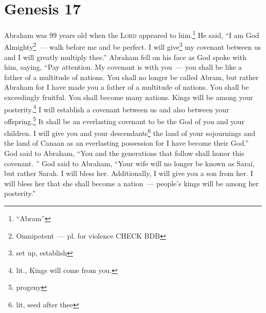 \section{Genesis 17}\label{Genesis 17}
\begin{enumerate}
     Abraham was 99 years old when the \textsc{Lord} appeared to him.\footnote{``Abram''} He said, ``I am God Almighty\footnote{Omnipotent~--- pl. for violence CHECK BDB}~--- walk before me and be perfect.%
     I will give\footnote{set up, establish} my covenant between us and I will greatly multiply thee.''%
     Abraham fell on his face as God spoke with him, saying,%
     ``Pay attention. My covenant is with you~--- you shall be like a father of a multitude of nations.%
     You shall no longer be called Abram, but rather Abraham for I have made you a father of a multitude of nations.%
     You shall be exceedingly fruitful. You shall become many nations. Kings will be among your posterity.\footnote{lit., Kings will come from you.}%
     I will establish a covenant between us and also between your offspring.\footnote{progeny} It shall be an everlasting covenant to be the God of you and your children.%
     I will give you and your descendants\footnote{lit, seed after thee} the land of your sojournings and the land of Canaan as an everlasting possession for I have become their God.''%
     God said to Abraham, ``You and the generations that follow shall honor this covenant.%
     ''%
     God said to Abraham, ``Your wife will no longer be known as Sarai, but rather Sarah.%
     I will bless her. Additionally, I will give you a son from her. I will bless her that she shall become a nation~--- people's kings will be among her posterity.''%
\end{enumerate}
